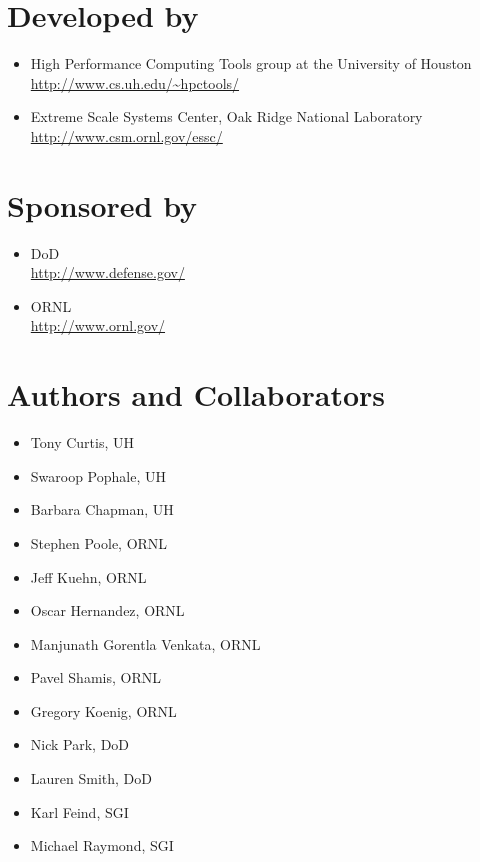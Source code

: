 \vfill{}

\section*{Developed by}
\begin{itemize}
\item High Performance Computing Tools group at the University of Houston\\
  \url{http://www.cs.uh.edu/~hpctools/} 
\item Extreme Scale Systems Center, Oak Ridge National Laboratory\\
  \url{http://www.csm.ornl.gov/essc/} 
\end{itemize}
\pagebreak{}

\section*{Sponsored by}
\begin{itemize}
\item \ac{DoD}\\
  \url{http://www.defense.gov/ }
\item \ac{ORNL}\\
  \url{http://www.ornl.gov/} 
\end{itemize}

\section*{Authors and Collaborators}
\begin{itemize}
\item Tony Curtis, \ac{UH}
\item Swaroop Pophale, \ac{UH}
\item Barbara Chapman, \ac{UH} 
\item Stephen Poole, \ac{ORNL}
\item Jeff Kuehn, \ac{ORNL}
\item Oscar Hernandez, \ac{ORNL}
\item Manjunath Gorentla Venkata, \ac{ORNL}
\item Pavel Shamis, \ac{ORNL}
\item Gregory Koenig, \ac{ORNL}
\item Nick Park, \ac{DoD}
\item Lauren Smith, \ac{DoD}
\item Karl Feind, SGI
\item Michael Raymond, SGI
\end{itemize}

